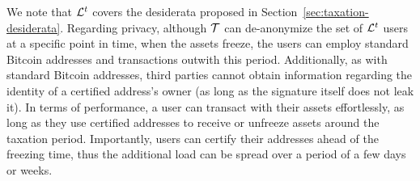 We note that $\mathcal{L}^{t}$ covers the desiderata proposed in
Section~\ref{sec:taxation-desiderata}. Regarding privacy, although $\mathcal{T}$ can
de-anonymize the set of $\mathcal{L}^{t}$ users at a specific point in time, \ie when
the assets freeze, the users can employ standard Bitcoin addresses and
transactions outwith this period. Additionally, as with standard Bitcoin
addresses, third parties cannot obtain information regarding the identity of a
certified address's owner (as long as the signature itself does not leak it).
In terms of performance, a user can transact with their assets effortlessly, as
long as they use certified addresses to receive or unfreeze assets around the
taxation period. Importantly, users can certify their addresses ahead
of the freezing time, thus the additional load can be spread over a period
of a few days or weeks.
